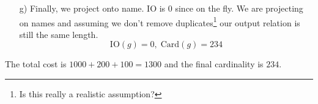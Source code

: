 \begin{example}
\begin{enumerate}
      \item[g)] Finally, we project onto name. IO is $0$ since on the fly. We are projecting on names and assuming we don't remove duplicates\footnote{Is this really a realistic assumption?} our output relation is still the same length. 
        \begin{equation}
          \mathrm{IO}(g) = 0, \; \mathrm{Card}(g) = 234
        \end{equation}
    \end{enumerate}
    The total cost is $1000 + 200 + 100 = 1300$ and the final cardinality is $234$. 
  \end{example}

